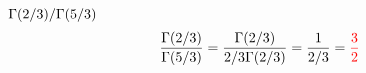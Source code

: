 \item [2.] $\Gamma(2/3)/\Gamma(5/3)$
\[
\frac{\Gamma(2/3)}{\Gamma(5/3)}=\frac{\Gamma(2/3)}{2/3\Gamma(2/3)}=\frac{1}{2/3}=\textcolor{red}{\frac{3}{2}}
\]
